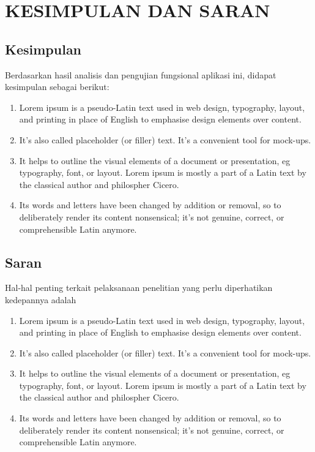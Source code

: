 \chapter{KESIMPULAN DAN SARAN}

\section{Kesimpulan}
\noindent Berdasarkan hasil analisis dan pengujian fungsional aplikasi ini, didapat kesimpulan sebagai berikut:

\begin{enumerate}
	\item Lorem ipsum is a pseudo-Latin text used in web design, typography, layout, and printing in place of English to emphasise design elements over content.

	\item It's also called placeholder (or filler) text. It's a convenient tool for mock-ups.

	\item It helps to outline the visual elements of a document or presentation, eg typography, font, or layout. Lorem ipsum is mostly a part of a Latin text by the classical author and philospher Cicero.

	\item Its words and letters have been changed by addition or removal, so to deliberately render its content nonsensical; it's not genuine, correct, or comprehensible Latin anymore.
\end{enumerate}


\section{Saran}
\noindent Hal-hal penting terkait pelaksanaan penelitian yang perlu diperhatikan kedepannya adalah
\begin{enumerate}
	\item Lorem ipsum is a pseudo-Latin text used in web design, typography, layout, and printing in place of English to emphasise design elements over content.

	\item It's also called placeholder (or filler) text. It's a convenient tool for mock-ups.

	\item It helps to outline the visual elements of a document or presentation, eg typography, font, or layout. Lorem ipsum is mostly a part of a Latin text by the classical author and philospher Cicero.

	\item Its words and letters have been changed by addition or removal, so to deliberately render its content nonsensical; it's not genuine, correct, or comprehensible Latin anymore.
\end{enumerate}


\begin{comment}

\end{comment}
